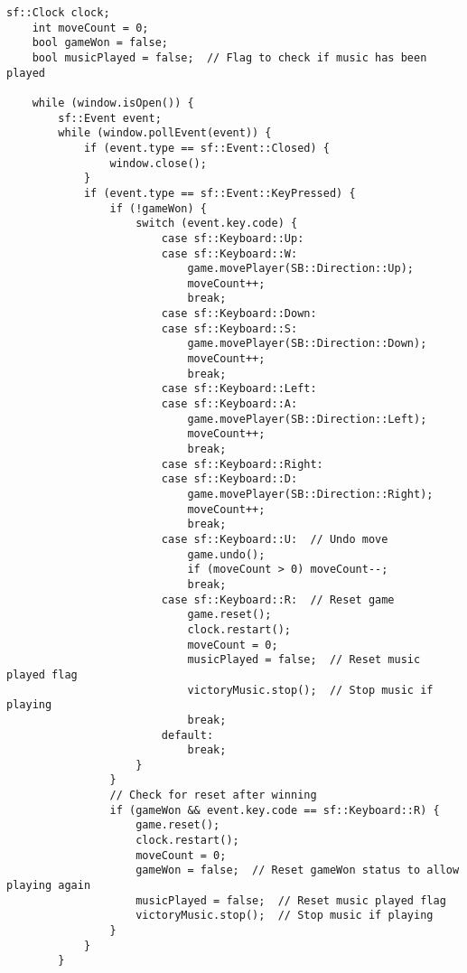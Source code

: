 \documentclass[12pt]{article}
\begin{document}
\begin{lstlisting}[style=cppcode]
    sf::Clock clock;
    int moveCount = 0;
    bool gameWon = false;
    bool musicPlayed = false;  // Flag to check if music has been played

    while (window.isOpen()) {
        sf::Event event;
        while (window.pollEvent(event)) {
            if (event.type == sf::Event::Closed) {
                window.close();
            }
            if (event.type == sf::Event::KeyPressed) {
                if (!gameWon) {
                    switch (event.key.code) {
                        case sf::Keyboard::Up:
                        case sf::Keyboard::W:
                            game.movePlayer(SB::Direction::Up);
                            moveCount++;
                            break;
                        case sf::Keyboard::Down:
                        case sf::Keyboard::S:
                            game.movePlayer(SB::Direction::Down);
                            moveCount++;
                            break;
                        case sf::Keyboard::Left:
                        case sf::Keyboard::A:
                            game.movePlayer(SB::Direction::Left);
                            moveCount++;
                            break;
                        case sf::Keyboard::Right:
                        case sf::Keyboard::D:
                            game.movePlayer(SB::Direction::Right);
                            moveCount++;
                            break;
                        case sf::Keyboard::U:  // Undo move
                            game.undo();
                            if (moveCount > 0) moveCount--;
                            break;
                        case sf::Keyboard::R:  // Reset game
                            game.reset();
                            clock.restart();
                            moveCount = 0;
                            musicPlayed = false;  // Reset music played flag
                            victoryMusic.stop();  // Stop music if playing
                            break;
                        default:
                            break;
                    }
                }
                // Check for reset after winning
                if (gameWon && event.key.code == sf::Keyboard::R) {
                    game.reset();
                    clock.restart();
                    moveCount = 0;
                    gameWon = false;  // Reset gameWon status to allow playing again
                    musicPlayed = false;  // Reset music played flag
                    victoryMusic.stop();  // Stop music if playing
                }
            }
        }


\end{lstlisting}
\end{document}
